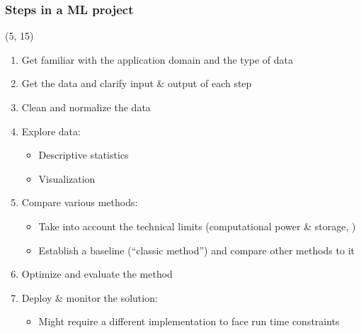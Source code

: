 \begin{frame}
  \frametitle{Steps in a \ac{ML} project}

  \begin{textblock}{90}(5, 15)
    \begin{enumerate}
    \item Get familiar with the application domain and the type of data
    \item Get the data and clarify input \& output of each step
    \item Clean and normalize the data
    \item Explore data:
      \begin{itemize}
      \item Descriptive statistics
      \item Visualization
      \end{itemize}
    \item Compare various methods:
      \begin{itemize}
      \item Take into account the technical limits (computational power \&
        storage, \etc{})
      \item Establish a baseline (``classic method'') and compare other methods
        to it
      \end{itemize}
    \item Optimize and evaluate the method
    \item Deploy \& monitor the solution:
      \begin{itemize}
      \item Might require a different implementation to face run time constraints
      \end{itemize}
    \end{enumerate}
  \end{textblock}
\end{frame}


